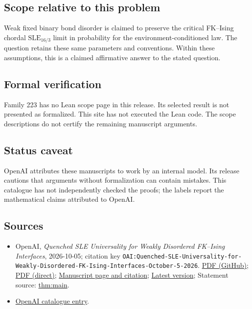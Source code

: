 \documentclass[11pt]{article}
\begin{document}
\subsection{Scope relative to this problem}
Weak fixed binary bond disorder is claimed to preserve the critical FK--Ising chordal $\mathrm{SLE}_{16/3}$ limit in probability for the environment-conditioned law. The question retains these same parameters and conventions. Within these assumptions, this is a claimed affirmative answer to the stated question.

\subsection{Formal verification}
Family 223 has no Lean scope page in this release. Its selected result is not presented as formalized. This site has not executed the Lean code. The scope descriptions do not certify the remaining manuscript arguments.

\subsection{Status caveat}
OpenAI attributes these manuscripts to work by an internal model. Its release cautions that arguments without formalization can contain mistakes. This catalogue has not independently checked the proofs; the labels report the mathematical claims attributed to OpenAI.

\subsection{Sources}
\begin{itemize}
\item OpenAI, \emph{Quenched SLE Universality for Weakly Disordered FK–Ising Interfaces}, 2026-10-05; citation key \texttt{OAI:Quenched-SLE-Universality-for-Weakly-Disordered-FK-Ising-Interfaces-October-5-2026}. \href{https://github.com/openai/math/blob/adc7f1241b42e322a6451854ab7e4b4c146bf78a/preprints/Quenched-SLE-Universality-for-Weakly-Disordered-FK-Ising-Interfaces-October-5-2026/quenched-fk-ising.pdf}{PDF (GitHub)}; \href{https://github.com/openai/math/raw/adc7f1241b42e322a6451854ab7e4b4c146bf78a/preprints/Quenched-SLE-Universality-for-Weakly-Disordered-FK-Ising-Interfaces-October-5-2026/quenched-fk-ising.pdf}{PDF (direct)}; \href{https://github.com/openai/math/blob/adc7f1241b42e322a6451854ab7e4b4c146bf78a/preprints/Quenched-SLE-Universality-for-Weakly-Disordered-FK-Ising-Interfaces-October-5-2026/README.md}{Manuscript page and citation}; \href{https://github.com/openai/math/blob/main/preprints/Quenched-SLE-Universality-for-Weakly-Disordered-FK-Ising-Interfaces-October-5-2026/quenched-fk-ising.pdf}{Latest version}; Statement source: \href{https://github.com/openai/math/blob/adc7f1241b42e322a6451854ab7e4b4c146bf78a/preprints/Quenched-SLE-Universality-for-Weakly-Disordered-FK-Ising-Interfaces-October-5-2026/build/sections/introduction.tex\#L80}{thm:main}.
\item \href{https://github.com/openai/math/blob/adc7f1241b42e322a6451854ab7e4b4c146bf78a/CONTENTS.md}{OpenAI catalogue entry}.
\end{itemize}
\end{document}
